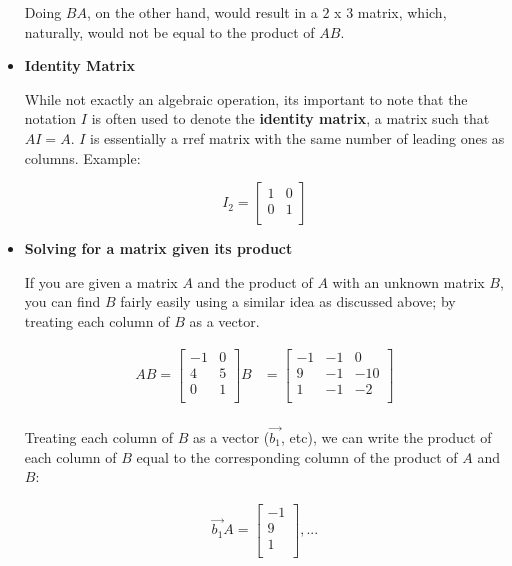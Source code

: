 \documentclass[12pt]{article}
\begin{document}
\begin{itemize}
    Doing $BA$, on the other hand, would result in a $2$ x $3$ matrix, which, naturally, would not be equal to the product of $AB$.
    
    \item \textbf{Identity Matrix}
    
    While not exactly an algebraic operation, its important to note that the notation $I$ is often used to denote the \textbf{identity matrix}, a matrix such that $AI = A$. $I$ is essentially a rref matrix with the same number of leading ones as columns. Example:
    
    \[
    I_{2} = \begin{bmatrix}
    1 & 0\\
    0 & 1\\
    \end{bmatrix}
    \]
    
    \item \textbf{Solving for a matrix given its product}
    
    If you are given a matrix $A$ and the product of $A$ with an unknown matrix $B$, you can find $B$ fairly easily using a similar idea as discussed above; by treating each column of $B$ as a vector.
    
    \begin{equation}
    \begin{split}
        AB = \begin{bmatrix}
        -1 & 0 \\
        4 & 5 \\
        0 & 1\\
        \end{bmatrix}B &= \begin{bmatrix}
        -1 & -1 & 0\\
        9 & -1 & -10\\
        1 & -1 & -2\\
        \end{bmatrix}\\
    \end{split}
    \end{equation}
    
    Treating each column of $B$ as a vector ($\vec{b_1}$, etc), we can write the product of each column of $B$ equal to the corresponding column of the product of $A$ and $B$:
    
    \begin{equation}
    \begin{split}
        \vec{b_1}A = \begin{bmatrix}
        -1\\
        9\\
        1\\
        \end{bmatrix}, ...
        \end{split}
    \end{equation}
    

\end{itemize}
\end{document}

